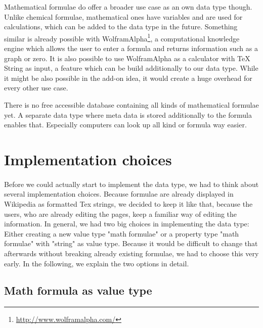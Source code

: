 \documentclass[12pt]{article}
\begin{document}
Mathematical formulae do offer a broader use case as an own data type though. Unlike chemical formulae, mathematical ones have variables and are used for calculations, which can be added to the data type in the future. Something similar is already possible with WolframAlpha\footnote{\url{http://www.wolframalpha.com/}}, a computational knowledge engine which allows the user to enter a formula and returns information such as a graph or zero. It is also possible to use WolframAlpha as a calculator with TeX String as input, a feature which can be build additionally to our data type. While it might be also possible in the add-on idea, it would create a huge overhead for every other use case.

There is no free accessible database containing all kinds of mathematical formulae yet. A separate data type where meta data is stored additionally to the formula enables that. Especially computers can look up all kind or formula way easier.

\section{Implementation choices}
\paragraph{}
Before we could actually start to implement the data type, we had to think about several implementation choices. Because formulae are already displayed in Wikipedia as formatted Tex strings, we decided to keep it like that, because the users, who are already editing the pages, keep a familiar way of editing the information. In general, we had two big choices in implementing the data type: Either creating a new value type "math formulae" or a property type "math formulae" with "string" as value type. Because it would be difficult to change that afterwards without breaking already existing formulae, we had to choose this very early.
In the following, we explain the two options in detail.

\subsection{Math formula as value type}
\end{document}
